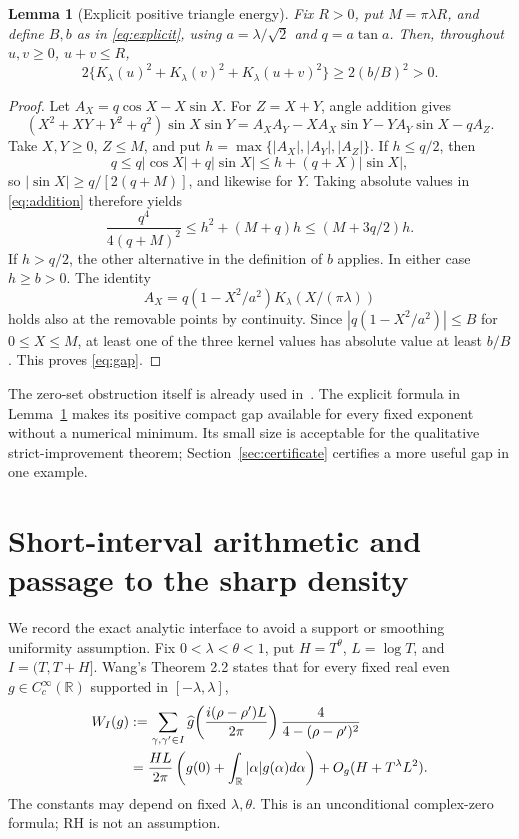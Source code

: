 \documentclass[11pt]{article}
\newtheorem{lemma}[theorem]{Lemma}
\theoremstyle{remark}
\newcommand{\R}{\mathbb R}
\begin{document}
\begin{lemma}[Explicit positive triangle energy]\label{lem:gap}
Fix $R>0$, put $M=\pi\lambda R$, and define $B,b$ as in
\eqref{eq:explicit}, using $a=\lambda/\sqrt2$ and $q=a\tan a$.
Then, throughout $u,v\ge0$, $u+v\le R$,
\begin{equation}\label{eq:gap}
 2\{K_\lambda(u)^2+K_\lambda(v)^2+K_\lambda(u+v)^2\}
 \ge2(b/B)^2>0.
\end{equation}
\end{lemma}
\begin{proof}
Let $A_X=q\cos X-X\sin X$. For $Z=X+Y$, angle addition gives
\begin{equation}\label{eq:addition}
 (X^2+XY+Y^2+q^2)\sin X\sin Y
 =A_XA_Y-XA_X\sin Y-YA_Y\sin X-qA_Z.
\end{equation}
Take $X,Y\ge0$, $Z\le M$, and put
$h=\max\{|A_X|,|A_Y|,|A_Z|\}$. If $h\le q/2$, then
\[
 q\le q|\cos X|+q|\sin X|
 \le h+(q+X)|\sin X|,
\]
so $|\sin X|\ge q/[2(q+M)]$, and likewise for $Y$. Taking absolute
values in \eqref{eq:addition} therefore yields
\[
 \frac{q^4}{4(q+M)^2}\le h^2+(M+q)h
 \le(M+3q/2)h.
\]
If $h>q/2$, the other alternative in the definition of $b$ applies.
In either case $h\ge b>0$. The identity
\[
 A_X=q(1-X^2/a^2)K_\lambda(X/(\pi\lambda))
\]
holds also at the removable points by continuity. Since
$|q(1-X^2/a^2)|\le B$ for $0\le X\le M$, at least one of the three
kernel values has absolute value at least $b/B$. This proves
\eqref{eq:gap}.
\end{proof}

The zero-set obstruction itself is already used in~\cite{Ainta}. The
explicit formula in Lemma~\ref{lem:gap} makes its positive compact gap
available for every fixed exponent without a numerical minimum. Its
small size is acceptable for the qualitative strict-improvement theorem;
Section~\ref{sec:certificate} certifies a more useful gap in one example.

\section{Short-interval arithmetic and passage to the sharp density}

We record the exact analytic interface to avoid a support or smoothing
uniformity assumption. Fix $0<\lambda<\theta<1$, put $H=T^\theta$,
$L=\log T$, and $I=(T,T+H]$. Wang's Theorem 2.2 states that for every
fixed real even $g\in C_c^\infty(\R)$ supported in $[-\lambda,\lambda]$,
\begin{align}\label{eq:wangtest}
 W_I(g)&:=\sum_{\gamma,\gamma'\in I}
 \widehat g\!\left(\frac{i(\rho-\rho')L}{2\pi}\right)
 \frac4{4-(\rho-\rho')^2}\notag\\
 &=\frac{HL}{2\pi}\left(g(0)+\int_\R|\alpha|g(\alpha)d\alpha\right)
      +O_g(H+T^\lambda L^2).
\end{align}
The constants may depend on fixed $\lambda,\theta$. This is an
unconditional complex-zero formula; RH is not an assumption.
\end{document}
